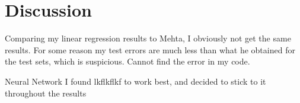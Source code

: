 \section{Discussion} \label{sec:discussion}
Comparing my linear regression results to Mehta, I obviously not get the same results. For some reason my test errors are much less than what he obtained for the test sets, which is suspicious. Cannot find the error in my code. 

Neural Network
I found lkflkflkf to work best, and decided to stick to it throughout the results